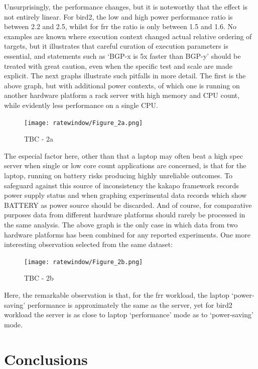 Unsurprisingly, the performance changes, but it is noteworthy that the effect is not entirely linear.
For bird2, the low and high power performance ratio is between 2.2 and 2.5, whilst for frr the ratio is only between 1.5 and 1.6.
No examples are known where execution context changed actual relative ordering of targets, but it illustrates that careful curation of execution parameters is essential, and statements such as ‘BGP-x is 5x faster than BGP-y’ should be treated with great caution, even when the specific test and scale are made explicit.
The next graphs illustrate such pitfalls in more detail.
The first is the above graph, but with additional power contexts, of which one is running on another hardware platform \- a rack server with high memory and CPU count, while evidently less performance on a single CPU.

\begin{figure}[H]
    \centering
    \texttt{[image: ratewindow/Figure\_2a.png]}
    \caption{TBC - 2a}
    \label{fig:rw_fig2a}
\end{figure}

The especial factor here, other than that a laptop may often beat a high spec server when single or low core count applications are concerned, is that for the laptop, running on battery risks producing highly unreliable outcomes.
To safeguard against this source of inconsistency the kakapo framework records power supply status and when graphing experimental data records which show BATTERY as power source should be discarded.
And of course, for comparative purposes data from different hardware platforms should rarely be processed in the same analysis.
The above graph is the only case in which data from two hardware platforms has been combined for any reported experiments.
One more interesting observation selected from the same dataset:

\begin{figure}[H]
    \centering
    \texttt{[image: ratewindow/Figure\_2b.png]}
    \caption{TBC - 2b}
    \label{fig:rw_fig2b}
\end{figure}

Here, the remarkable observation is that, for the frr workload, the laptop ‘power-saving’ performance is approximately the same as the server, yet for bird2 workload the server is as close to laptop ‘performance’ mode as to ‘power-saving’ mode.

\section{Conclusions}

